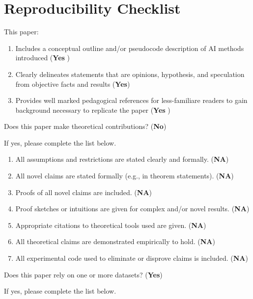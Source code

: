 \newpage
\section*{Reproducibility Checklist}

This paper:

\begin{enumerate}
    \item Includes a conceptual outline and/or pseudocode description of AI methods introduced (\textbf{Yes} )
    \item Clearly delineates statements that are opinions, hypothesis, and speculation from objective facts and results (\textbf{Yes})
    \item Provides well marked pedagogical references for less-familiare readers to gain background necessary to replicate the paper (\textbf{Yes} )
\end{enumerate}

\noindent Does this paper make theoretical contributions? (\textbf{No})

\noindent If yes, please complete the list below.

\begin{enumerate}
    \item All assumptions and restrictions are stated clearly and formally. (\textbf{NA})
    \item All novel claims are stated formally (e.g., in theorem statements). (\textbf{NA})
    \item Proofs of all novel claims are included. (\textbf{NA})
    \item Proof sketches or intuitions are given for complex and/or novel results. (\textbf{NA})
    \item Appropriate citations to theoretical tools used are given. (\textbf{NA})
    \item All theoretical claims are demonstrated empirically to hold. (\textbf{NA})
    \item All experimental code used to eliminate or disprove claims is included. (\textbf{NA})
\end{enumerate}

\noindent Does this paper rely on one or more datasets? (\textbf{Yes})

\noindent If yes, please complete the list below.

